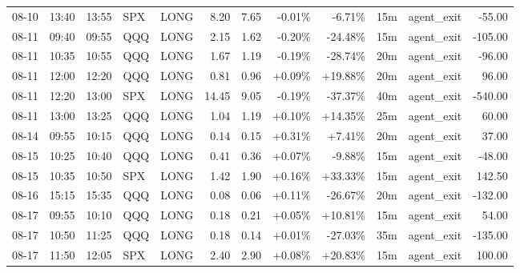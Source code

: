 \documentclass[11pt,a4paper]{article}
\begin{document}
\begin{center}
\begin{longtable}{>{\color{txtmain}}l l l l l r r r r r >{\color{txtmain}}l r}
08-10 & 13:40 & 13:55 & SPX & LONG & 8.20 & 7.65 & \textcolor{lossred}{-0.01\%} & \textcolor{lossred}{-6.71\%} & 15m & agent\_exit & \textcolor{lossred}{-55.00} \\
08-11 & 09:40 & 09:55 & QQQ & LONG & 2.15 & 1.62 & \textcolor{lossred}{-0.20\%} & \textcolor{lossred}{-24.48\%} & 15m & agent\_exit & \textcolor{lossred}{-105.00} \\
08-11 & 10:35 & 10:55 & QQQ & LONG & 1.67 & 1.19 & \textcolor{lossred}{-0.19\%} & \textcolor{lossred}{-28.74\%} & 20m & agent\_exit & \textcolor{lossred}{-96.00} \\
08-11 & 12:00 & 12:20 & QQQ & LONG & 0.81 & 0.96 & \textcolor{wingreen}{+0.09\%} & \textcolor{wingreen}{+19.88\%} & 20m & agent\_exit & \textcolor{wingreen}{96.00} \\
08-11 & 12:20 & 13:00 & SPX & LONG & 14.45 & 9.05 & \textcolor{lossred}{-0.19\%} & \textcolor{lossred}{-37.37\%} & 40m & agent\_exit & \textcolor{lossred}{-540.00} \\
08-11 & 13:00 & 13:25 & QQQ & LONG & 1.04 & 1.19 & \textcolor{wingreen}{+0.10\%} & \textcolor{wingreen}{+14.35\%} & 25m & agent\_exit & \textcolor{wingreen}{60.00} \\
08-14 & 09:55 & 10:15 & QQQ & LONG & 0.14 & 0.15 & \textcolor{wingreen}{+0.31\%} & \textcolor{wingreen}{+7.41\%} & 20m & agent\_exit & \textcolor{wingreen}{37.00} \\
08-15 & 10:25 & 10:40 & QQQ & LONG & 0.41 & 0.36 & \textcolor{wingreen}{+0.07\%} & \textcolor{lossred}{-9.88\%} & 15m & agent\_exit & \textcolor{lossred}{-48.00} \\
08-15 & 10:35 & 10:50 & SPX & LONG & 1.42 & 1.90 & \textcolor{wingreen}{+0.16\%} & \textcolor{wingreen}{+33.33\%} & 15m & agent\_exit & \textcolor{wingreen}{142.50} \\
08-16 & 15:15 & 15:35 & QQQ & LONG & 0.08 & 0.06 & \textcolor{wingreen}{+0.11\%} & \textcolor{lossred}{-26.67\%} & 20m & agent\_exit & \textcolor{lossred}{-132.00} \\
08-17 & 09:55 & 10:10 & QQQ & LONG & 0.18 & 0.21 & \textcolor{wingreen}{+0.05\%} & \textcolor{wingreen}{+10.81\%} & 15m & agent\_exit & \textcolor{wingreen}{54.00} \\
08-17 & 10:50 & 11:25 & QQQ & LONG & 0.18 & 0.14 & \textcolor{wingreen}{+0.01\%} & \textcolor{lossred}{-27.03\%} & 35m & agent\_exit & \textcolor{lossred}{-135.00} \\
08-17 & 11:50 & 12:05 & SPX & LONG & 2.40 & 2.90 & \textcolor{wingreen}{+0.08\%} & \textcolor{wingreen}{+20.83\%} & 15m & agent\_exit & \textcolor{wingreen}{100.00} \\

\end{longtable}
\end{center}
\end{document}
